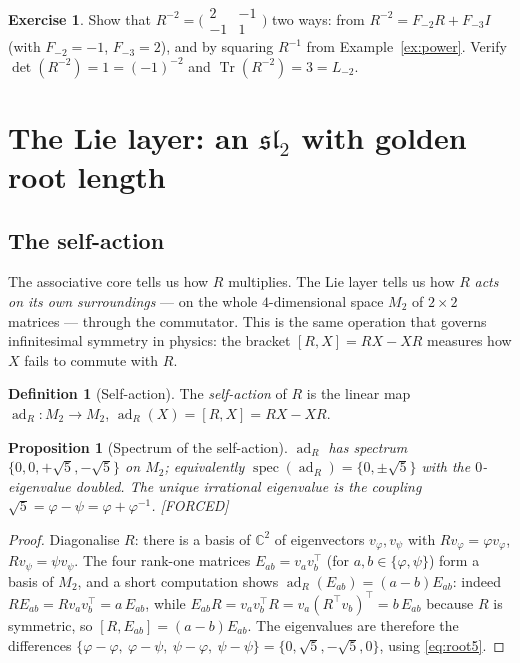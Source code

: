 \documentclass[11pt]{article}
\theoremstyle{plain}
\newtheorem{proposition}[theorem]{Proposition}
\theoremstyle{definition}
\newtheorem{definition}[theorem]{Definition}
\newtheorem{exercise}[theorem]{Exercise}
\theoremstyle{remark}
\newcommand{\Forced}{\textcolor{forcedc}{[FORCED]}}
\newcommand{\Tr}{\operatorname{Tr}}
\newcommand{\ad}{\operatorname{ad}}
\newcommand{\spec}{\operatorname{spec}}
\begin{document}
\begin{exercise}\label{exr:order}
Show that $R^{-2}=\bigl(\begin{smallmatrix}2&-1\\-1&1\end{smallmatrix}\bigr)$ two ways: from $R^{-2}=F_{-2}R+F_{-3}I$ (with $F_{-2}=-1$, $F_{-3}=2$), and by squaring $R^{-1}$ from Example~\ref{ex:power}. Verify $\det(R^{-2})=1=(-1)^{-2}$ and $\Tr(R^{-2})=3=L_{-2}$.
\end{exercise}

\section{The Lie layer: an $𝔰𝔩_2$ with golden root length}\label{sec:lie}

\subsection{The self-action}
The associative core tells us how $R$ multiplies. The Lie layer tells us how $R$ \emph{acts on its own surroundings} --- on the whole $4$-dimensional space $M_2$ of $2×2$ matrices --- through the commutator. This is the same operation that governs infinitesimal symmetry in physics: the bracket $[R,X]=RX-XR$ measures how $X$ fails to commute with $R$.

\begin{definition}[Self-action]\label{def:adR}
The \emph{self-action} of $R$ is the linear map $\ad_R\colon M_2→M_2$, $\ad_R(X)=[R,X]=RX-XR$.
\end{definition}

\begin{proposition}[Spectrum of the self-action]\label{prop:adspec}
$\ad_R$ has spectrum $\{0,0,+\sqrt5,-\sqrt5\}$ on $M_2$; equivalently $\spec(\ad_R)=\{0,\pm\sqrt5\}$ with the $0$-eigenvalue doubled. The unique irrational eigenvalue is the \emph{coupling} $\sqrt5=φ-ψ=φ+φ^{-1}$. \Forced
\end{proposition}
\begin{proof}
Diagonalise $R$: there is a basis of $ℂ^{2}$ of eigenvectors $v_φ,v_ψ$ with $Rv_φ=φv_φ$, $Rv_ψ=ψv_ψ$. The four rank-one matrices $E_{ab}=v_a v_b^{\!\top}$ (for $a,b∈\{φ,ψ\}$) form a basis of $M_2$, and a short computation shows $\ad_R(E_{ab})=(a-b)E_{ab}$: indeed $R E_{ab}=R v_a v_b^{\!\top}=a\,E_{ab}$, while $E_{ab}R=v_a v_b^{\!\top}R=v_a(R^{\!\top}v_b)^{\!\top}=b\,E_{ab}$ because $R$ is symmetric, so $[R,E_{ab}]=(a-b)E_{ab}$. The eigenvalues are therefore the differences $\{φ-φ,\ φ-ψ,\ ψ-φ,\ ψ-ψ\}=\{0,\sqrt5,-\sqrt5,0\}$, using \eqref{eq:root5}.
\end{proof}
\end{document}
